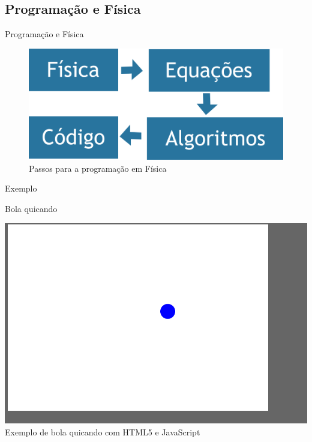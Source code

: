 \documentclass[xcolor=dvipsnames,table]{beamer}
\begin{document}
	\subsection{Programação e Física}
	\begin{frame}{Programação e Física}
		\begin{figure}		
			\begin{center}
	    		\includegraphics[height=.5\textheight]{images/fluxograma.png}
	    		\caption{Passos para a programação em Física}
	  		\end{center}
	  	\end{figure}
	\end{frame}
	
	\begin{frame}{Exemplo}
		\begin{block}{Bola quicando}
			\begin{center}
	    		\includegraphics[height=.7\textheight]{images/bola-quicando.png}
	    		\\Exemplo de bola quicando com HTML5 e JavaScript
	  		\end{center}
		\end{block}
	\end{frame}
	
\end{document}
